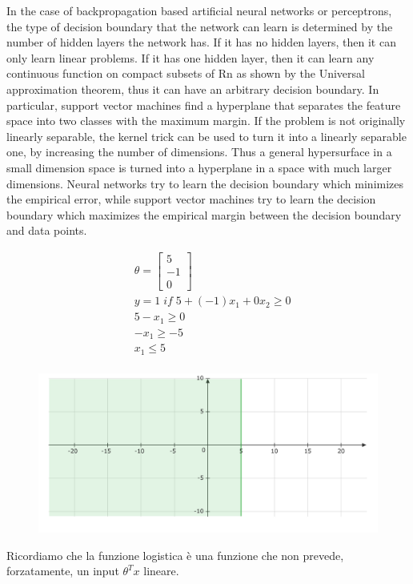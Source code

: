 \begin{nota}
In the case of backpropagation based artificial neural networks or perceptrons, the type of decision boundary that the network can learn is determined by the number of hidden layers the network has. If it has no hidden layers, then it can only learn linear problems. If it has one hidden layer, then it can learn any continuous function on compact subsets of Rn as shown by the Universal approximation theorem, thus it can have an arbitrary decision boundary. In particular, support vector machines find a hyperplane that separates the feature space into two classes with the maximum margin. If the problem is not originally linearly separable, the kernel trick can be used to turn it into a linearly separable one, by increasing the number of dimensions. Thus a general hypersurface in a small dimension space is turned into a hyperplane in a space with much larger dimensions. Neural networks try to learn the decision boundary which minimizes the empirical error, while support vector machines try to learn the decision boundary which maximizes the empirical margin between the decision boundary and data points. 
\end{nota}
\begin{esempio}
  \begin{align*}& \theta = \begin{bmatrix}5 \\ -1 \\ 0\end{bmatrix} \\ & y = 1 \; if \; 5 + (-1) x_1 + 0 x_2 \geq 0 \\ & 5 - x_1 \geq 0 \\ & - x_1 \geq -5 \\& x_1 \leq 5 \\ \end{align*}
    \begin{figure}[h!]
        \centering
        \includegraphics[width=1\textwidth]{img/diagram-1.png}
    \end{figure}
\end{esempio}
Ricordiamo che la funzione logistica è una funzione che non prevede, forzatamente, un input $\theta^T x$ lineare. 
